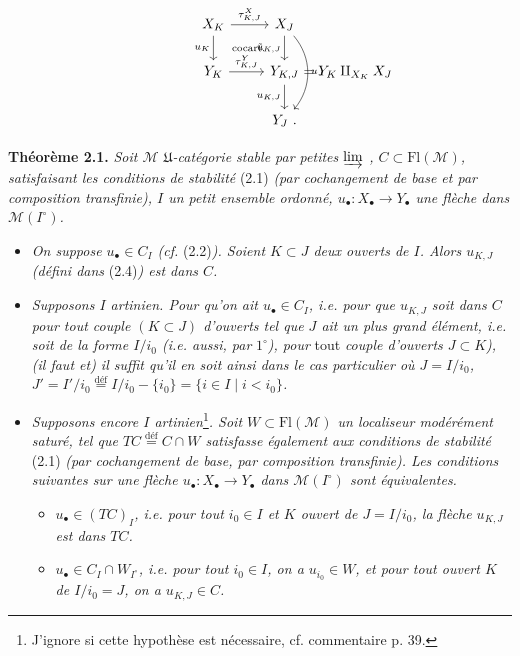 \documentclass[11pt]{article}
\newcommand{\msp}[1]{\ifstrequal{#1}{page 1}{}{\marginpar{\footnotesize [#1]}}}
\newcommand{\Fl}{\mathrm{Fl}}
\newcommand{\M}{\mathcal{M}}
\begin{document}
\msp{page 26}

\[
\begin{tikzcd}
X_K \arrow[r, "\tau^X_{K,J}"] \arrow[d, "u_K"'] \arrow[dr, phantom, "\text{\scriptsize cocart.}"] & X_J \arrow[d, "\tilde{u}_{K,J}"'] \arrow[dd, bend left=40, "u_J"] \\
Y_K \arrow[r, "\tau^Y_{K,J}"] & Y_{K,J} \rlap{$\ = Y_K \amalg_{X_K} X_J$} \arrow[d, "u_{K,J}"'] \\
 & Y_J \ .
\end{tikzcd}
\]

\textbf{Théorème 2.1.} \textit{Soit $\M$ $\mathfrak{U}$-catégorie stable par petites $\varinjlim$ , $C \subset \Fl(\M)$, satisfaisant les conditions de stabilité} \textup{(2.1)} \textit{(par cochangement de base et par composition transfinie), $I$ un petit ensemble ordonné, $u_\bullet : X_\bullet \longrightarrow Y_\bullet$ une flèche dans $\M(I^\circ)$.}
\begin{itemize}[leftmargin=3em]
\item[$1^\circ$)] \textit{On suppose $u_\bullet \in C_I$ (cf.} \textup{(2.2)}\textit{). Soient $K \subset J$ deux ouverts de $I$. Alors $u_{K,J}$ (défini dans} \textup{(2.4)}\textit{) est dans $C$.}
\item[$2^\circ$)] \textit{Supposons $I$ artinien. Pour qu'on ait $u_\bullet \in C_I$, i.e. pour que $u_{K,J}$ soit dans $C$ pour tout couple $(K \subset J)$ d'ouverts tel que $J$ ait un plus grand élément, i.e. soit de la forme $I/i_0$ (i.e. aussi, par} $1^\circ$\textit{), pour} \textup{tout} \textit{couple d'ouverts $J \subset K$), (il faut et) il suffit qu'il en soit ainsi dans le cas particulier où $J = I/i_0$, $J' = I'/i_0 \overset{\text{déf}}{=} I/i_0 - \{i_0\} = \{i \in I \mid i < i_0\}$.}

\msp{page 27}
\item[$3^\circ$)] \textit{Supposons encore $I$ artinien}\footnote[11]{J'ignore si cette hypothèse est nécessaire, cf. commentaire p. 39.}\textit{. Soit $W \subset \Fl(\M)$ un localiseur modérément saturé, tel que $TC \overset{\text{déf}}{=} C \cap W$ satisfasse également aux conditions de stabilité} \textup{(2.1)} \textit{(par cochangement de base, par composition transfinie). Les conditions suivantes sur une flèche $u_\bullet : X_\bullet \longrightarrow Y_\bullet$ dans $\M(I^\circ)$ sont équivalentes.}
\begin{itemize}[leftmargin=2em]
\item[a)] \textit{$u_\bullet \in (TC)_I$, i.e. pour tout $i_0 \in I$ et $K$ ouvert de $J = I/i_0$, la flèche $u_{K,J}$ est dans $TC$.}
\item[b)] \textit{$u_\bullet \in C_I \cap W_{I^\circ}$, i.e. pour tout $i_0 \in I$, on a $u_{i_0} \in W$, et pour tout ouvert $K$ de $I/i_0 = J$, on a $u_{K,J} \in C$.}
\end{itemize}
\end{itemize}
\end{document}

